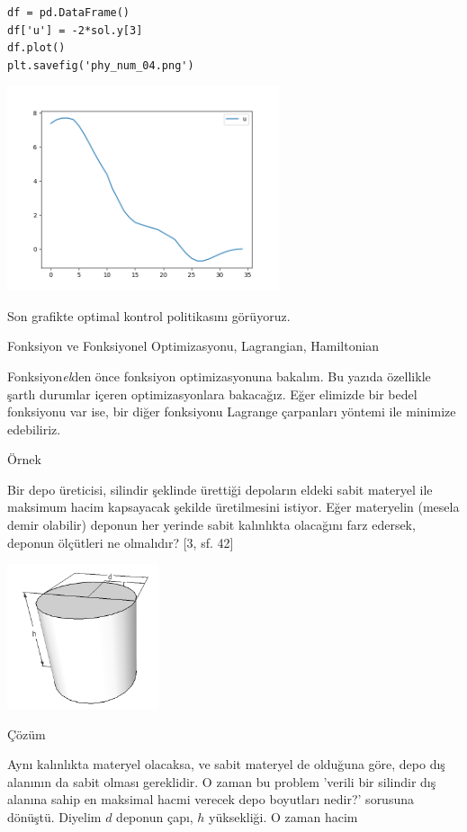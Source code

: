 \documentclass[12pt,fleqn]{article}\usepackage{../../common}
\begin{document}
\begin{verbatim}
df = pd.DataFrame()
df['u'] = -2*sol.y[3]
df.plot()
plt.savefig('phy_num_04.png')
\end{verbatim}

\includegraphics[height=6cm]{phy_num_04.png}

Son grafikte optimal kontrol politikasını görüyoruz. 

Fonksiyon ve Fonksiyonel Optimizasyonu, Lagrangian, Hamiltonian

Fonksiyon{\em el}den önce fonksiyon optimizasyonuna bakalım. Bu yazıda
özellikle şartlı durumlar içeren optimizasyonlara bakacağız. Eğer elimizde
bir bedel fonksiyonu var ise, bir diğer fonksiyonu Lagrange çarpanları
yöntemi ile minimize edebiliriz.

Örnek

Bir depo üreticisi, silindir şeklinde ürettiği depoların eldeki sabit
materyel ile maksimum hacim kapsayacak şekilde üretilmesini istiyor. Eğer
materyelin (mesela demir olabilir) deponun her yerinde sabit kalınlıkta
olacağını farz edersek, deponun ölçütleri ne olmalıdır? [3, sf. 42]

\includegraphics[width=12em]{cylinder.png}

Çözüm

Aynı kalınlıkta materyel olacaksa, ve sabit materyel de olduğuna göre, depo
dış alanının da sabit olması gereklidir. O zaman bu problem 'verili bir
silindir dış alanına sahip en maksimal hacmi verecek depo boyutları nedir?'
sorusuna dönüştü. Diyelim $d$ deponun çapı, $h$ yüksekliği. O zaman hacim
\end{document}
